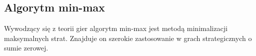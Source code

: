 \subsection{Algorytm min-max}
\label{subsec:algorytm-min-max}

Wywodzący się z teorii gier algorytm min-max jest metodą minimalizacji maksymalnych strat.
Znajduje on szerokie zastosowanie w grach strategicznych o sumie zerowej.
